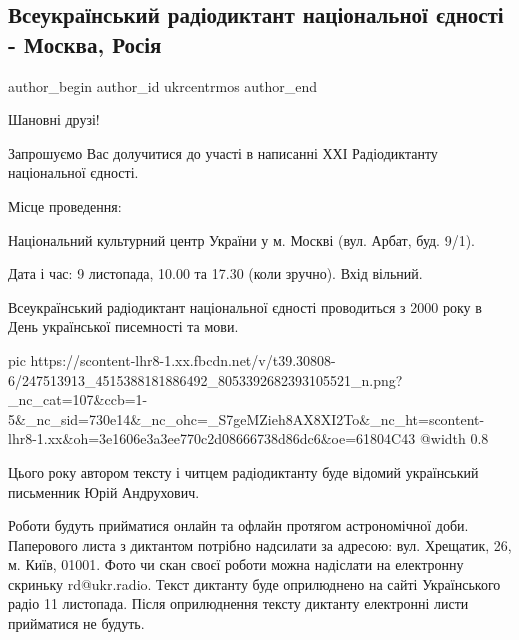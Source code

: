  
 
 
 
 
 
\subsection{Всеукраїнський радіодиктант національної єдності - Москва, Росія}
\label{sec:27_10_2021.fb.ukrcentrmos.1.radiodiktant}
 
\ifcmt
 author_begin
   author_id ukrcentrmos
 author_end
\fi

Шановні друзі!

Запрошуємо Вас долучитися до участі в написанні ХХІ Радіодиктанту національної єдності.

Місце проведення: 

Національний культурний центр України у м. Москві (вул. Арбат, буд. 9/1).

Дата і час: 9 листопада, 10.00 та 17.30 (коли зручно). Вхід вільний.

Всеукраїнський радіодиктант національної єдності проводиться з 2000 року в День
української писемності та мови.

\ifcmt
  pic https://scontent-lhr8-1.xx.fbcdn.net/v/t39.30808-6/247513913_4515388181886492_8053392682393105521_n.png?_nc_cat=107&ccb=1-5&_nc_sid=730e14&_nc_ohc=_S7geMZieh8AX8XI2To&_nc_ht=scontent-lhr8-1.xx&oh=3e1606e3a3ee770c2d08666738d86dc6&oe=61804C43
  @width 0.8
\fi

Цього року автором тексту і читцем радіодиктанту буде відомий український
письменник Юрій Андрухович.

Роботи будуть прийматися онлайн та офлайн протягом астрономічної доби.
Паперового листа з диктантом потрібно надсилати за адресою: вул. Хрещатик, 26,
м. Київ, 01001. Фото чи скан своєї роботи можна надіслати на електронну
скриньку rd@ukr.radio. Текст диктанту буде оприлюднено на сайті Українського
радіо 11 листопада. Після оприлюднення тексту диктанту електронні листи
прийматися не будуть.


